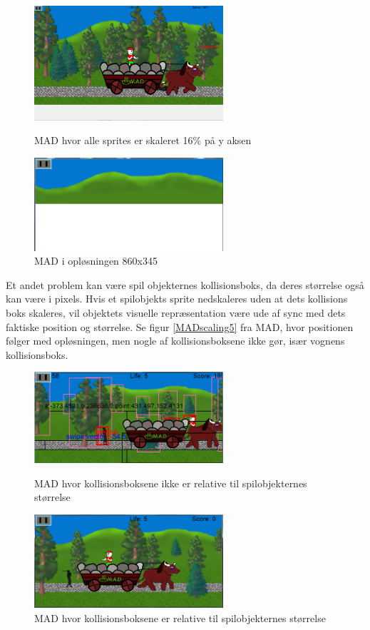 \documentclass[Main.tex]{PositionOgSkalering}
\begin{document}
\begin{figure}[h]
\centering
\parbox{7cm}{   
\includegraphics[width = 7cm]{billeder/MADscaling3}
\caption{MAD hvor alle sprites er skaleret 16\% på y aksen}    
\label{MADscaling3}}
\qquad
\begin{minipage}{7cm}
\includegraphics[width = 7cm]{billeder/MADscaling4}
\caption{MAD i opløsningen 860x345}    
\label{MADscaling4}
\end{minipage}
\end{figure}

Et andet problem kan være spil objekternes kollisionsboks, da deres størrelse også kan være i pixels. Hvis et spilobjekts sprite nedskaleres uden at dets kollisions boks skaleres, vil objektets visuelle repræsentation være ude af sync med dets faktiske position og størrelse. Se figur \ref{MADscaling5} fra MAD, hvor positionen følger med opløsningen, men nogle af kollisionsboksene ikke gør, især vognens kollisionsboks. 

\begin{figure}[h]
\centering
\parbox{7cm}{   
\includegraphics[width = 7cm]{billeder/MADscaling5}
\caption{MAD hvor kollisionsboksene ikke er relative til spilobjekternes størrelse}    
\label{MADscaling5}}
\qquad
\begin{minipage}{7cm}
\includegraphics[width = 7cm]{billeder/MADscaling6}
\caption{MAD hvor kollisionsboksene er relative til spilobjekternes størrelse}    
\label{MADscaling6}
\end{minipage}
\end{figure}
\end{document}
